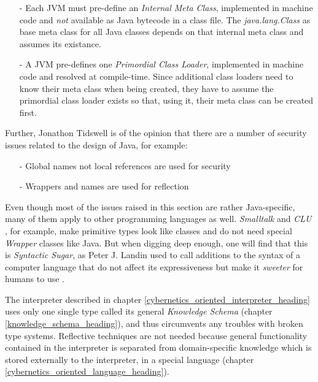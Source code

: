 \begin{itemize}
    \item[-] Each JVM must pre-define an \emph{Internal Meta Class}, implemented
        in machine code and \emph{not} available as Java bytecode in a class file.
        The \emph{java.lang.Class} as base meta class for all Java classes depends
        on that internal meta class and assumes its existance.
    \item[-] A JVM pre-defines one \emph{Primordial Class Loader}, implemented in
        machine code and resolved at compile-time. Since additional class loaders
        need to know their meta class when being created, they have to assume the
        primordial class loader exists so that, using it, their meta class can be
        created first.
\end{itemize}

Further, Jonathon Tidswell \cite{josgeneral} is of the opinion that there are a
number of security issues related to the design of Java, for example:

\begin{itemize}
    \item[-] Global names not local references are used for security
    \item[-] Wrappers and names are used for reflection
\end{itemize}

Even though most of the issues raised in this section are rather Java-specific,
many of them apply to other programming languages as well. \emph{Smalltalk}
\cite{smalltalk} and \emph{CLU} \cite{clu}, for example, make primitive types
look like classes and do not need special \emph{Wrapper} classes like Java. But
when digging deep enough, one will find that this is \emph{Syntactic Sugar}, as
Peter J. Landin used to call additions to the syntax of a computer language
that do not affect its expressiveness but make it \emph{sweeter} for humans to
use \cite{wikipedia}.

The interpreter described in chapter \ref{cybernetics_oriented_interpreter_heading}
uses only one single type called its general \emph{Knowledge Schema} (chapter
\ref{knowledge_schema_heading}), and thus circumvents any troubles with broken
type systems. Reflective techniques are not needed because general
functionality contained in the interpreter is separated from domain-specific
knowledge which is stored externally to the interpreter, in a special language
(chapter \ref{cybernetics_oriented_language_heading}).
